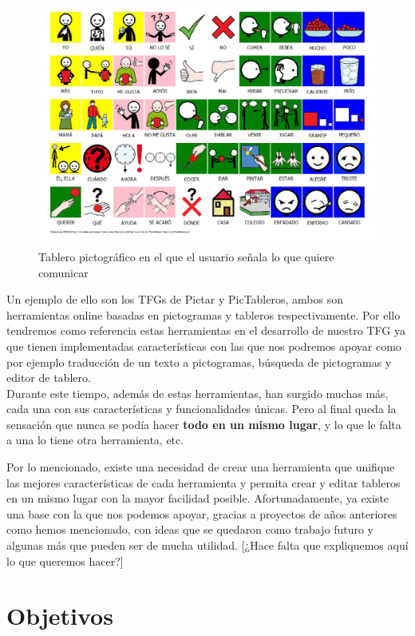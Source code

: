 \begin{figure}[h!]
	\centering
	\includegraphics[width=0.7\linewidth]{Imagenes/Bitmap/Introduccion/tablero Picto}
	\caption[Tablero pictográfico]{Tablero pictográfico en el que el usuario señala lo que quiere comunicar}
	\label{fig:tablero-picto}
\end{figure}


Un ejemplo de ello son los TFGs de Pictar y PicTableros, ambos son herramientas online basadas en pictogramas y tableros respectivamente. Por ello tendremos como referencia estas herramientas en el desarrollo de nuestro TFG ya que tienen implementadas características con las que nos podremos apoyar como por ejemplo traducción de un texto a pictogramas, búsqueda de pictogramas y editor de tablero.\\

Durante este tiempo, además de estas herramientas, han surgido muchas más, cada una con sus características y funcionalidades únicas. Pero al final queda la sensación que nunca se podía hacer\textbf{ todo en un mismo lugar}, y lo que le falta a una lo tiene otra herramienta, etc. 

Por lo mencionado, existe una necesidad de crear una herramienta que unifique las mejores características de cada herramienta y permita crear y editar tableros en un mismo lugar con la mayor facilidad posible. Afortunadamente, ya existe una base con la que nos podemos apoyar, gracias a proyectos de años anteriores como hemos mencionado, con ideas que se quedaron como trabajo futuro y algunas más que pueden ser de mucha utilidad. [¿Hace falta que expliquemos aquí lo que queremos hacer?]



\section{Objetivos}
\label{cap1:sec:Objetivos}

